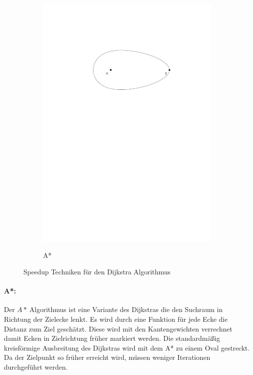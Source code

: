 \begin{figure}[h]
\begin{subfigure}{0.30\textwidth}
\includegraphics[width = \textwidth]{../media/stardijkstra.pdf} \\
\vspace{0.9cm}
\caption{A*}
\label{fig:starD}
\end{subfigure}
\caption{Speedup Techniken für den Dijkstra Algorithmus}
\label{speedup}
\end{figure}


\paragraph*{A*:}
Der $A*~$Algorithmus ist eine Variante des Dijkstras die den Suchraum in Richtung der Zielecke lenkt.
Es wird durch eine Funktion für jede Ecke die Distanz zum Ziel geschätzt.
Diese wird mit den Kantengewichten verrechnet damit Ecken in Zielrichtung früher markiert werden.
Die standardmäßig kreisförmige Ausbreitung des Dijkstras wird mit dem A* zu einem Oval gestreckt.
Da der Zielpunkt so früher erreicht wird, müssen weniger Iterationen durchgeführt werden.


